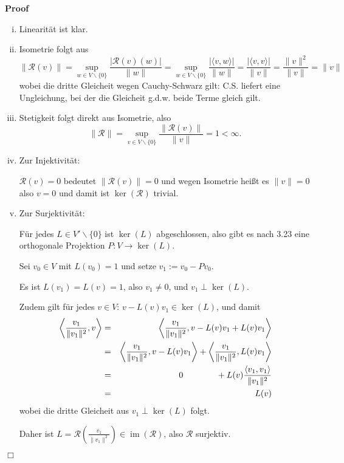 \documentclass{book}
\newcommand{\assign}{:=}
\newcommand{\tmop}[1]{\ensuremath{\operatorname{#1}}}
\newenvironment{enumerateroman}{\begin{enumerate}[i.] }{\end{enumerate}}
\newenvironment{proof}{\noindent\textbf{Proof\ }}{\hspace*{\fill}$\Box$\medskip}
\begin{document}
\begin{proof}
  
  \begin{enumerateroman}
    \item Linearit{\"a}t ist klar.
    
    \item Isometrie folgt aus
    \[ \| \mathcal{R} (v) \| = \sup_{w \in V \backslash \{ 0 \}} \frac{|
       \mathcal{R} (v) (w) |}{\| w \|} = \sup_{w \in V \backslash \{ 0 \}}
       \frac{| \langle v, w \rangle |}{\| w \|} = \frac{| \langle v, v \rangle
       |}{\| v \|} = \frac{\| v \|^2}{\| v \|} = \| v \| \]
    wobei die dritte Gleicheit wegen Cauchy-Schwarz gilt: C.S. liefert eine
    Ungleichung, bei der die Gleicheit g.d.w. beide Terme gleich gilt.
    
    \item Stetigkeit folgt direkt aus Isometrie, also
    \[ \| \mathcal{R} \| = \sup_{v \in V \backslash \{ 0 \}} \frac{\|
       \mathcal{R} (v) \|}{\| v \|} = 1 < \infty . \]
    \item Zur Injektivit{\"a}t:
    
    $\mathcal{R} (v) = 0$ bedeutet $\| \mathcal{R} (v) \| = 0$ und wegen
    Isometrie hei{\ss}t es $\| v \| = 0$ also $v = 0$ und damit ist $\ker
    (\mathcal{R})$ trivial.
    
    \item Zur Surjektivit{\"a}t:
    
    F{\"u}r jedes $L \in V' \backslash \{ 0 \}$ ist $\ker (L)$ abgeschlossen,
    also gibt es nach 3.23 eine orthogonale Projektion $P : V \rightarrow \ker
    (L)$.
    
    Sei $v_0 \in V$ mit $L (v_0) = 1$ und setze $v_1 \assign v_0 - P \text{}
    v_0$.
    
    Es ist $L (v_1) = L (v) = 1$, also $v_1 \neq 0$, und $v_1 \perp \ker (L)$.
    
    Zudem gilt f{\"u}r jedes $v \in V$: $v - L (v) v_1 \in \ker (L)$, und
    damit
    \begin{eqnarray*}
      \left\langle \frac{v_1}{\| v_1 \|^2}, v \right\rangle & = & \left\langle
      \frac{v_1}{\| v_1 \|^2}, v - L (v) v_1 + L (v) v_1 \right\rangle\\
      & = & \left\langle \frac{v_1}{\| v_1 \|^2}, v - L (v) v_1 \right\rangle
      + \left\langle \frac{v_1}{\| v_1 \|^2}, L (v) v_1 \right\rangle\\
      & = & \text{{\hspace{5em}}} 0 \hspace{3.9em} + L (v) \frac{\langle v_1,
      v_1 \rangle}{\| v_1  \|^2}\\
      & = & L (v)
    \end{eqnarray*}
    wobei die dritte Gleicheit aus $v_1 \perp \ker (L)$ folgt.
    
    Daher ist $L = \mathcal{R} \left( \frac{v_1}{\| v_1 \|^2} \right) \in
    \tmop{im} (\mathcal{R})$, also $\mathcal{R}$ surjektiv.
  \end{enumerateroman}
\end{proof}
\end{document}
